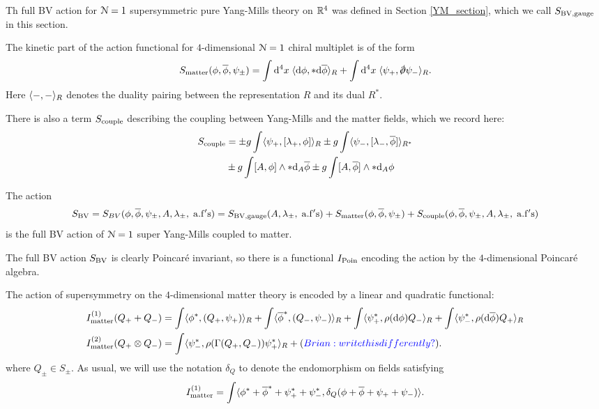 \documentclass[10pt, oneside]{article}
\begin{document}
Th full BV action for $\cN=1$ supersymmetric pure Yang-Mills theory on $\RR^4$ was defined in Section \ref{YM_section}, which we call $S_{\rm BV, gauge}$ in this section.

The kinetic part of the action functional for $4$-dimensional $\mc N = 1$ chiral multiplet is of the form
\[
S_{\rm matter} (\phi, \Bar{\phi}, \psi_{\pm}) = \int \d^4 x \; \<\d \phi , * \d \Bar{\phi}\>_R + \int \d^4 x \; \<\psi_+ , \sd \dd \psi_-\>_R .
\]
Here $\<-,-\>_R$ denotes the duality pairing between the representation $R$ and its dual $R^*$. 

There is also a term $S_{\rm couple}$ describing the coupling between Yang-Mills and the matter fields, which we record here:
\begin{align*}
S_{\rm couple} & = \pm g \int \<\psi_+, [\lambda_+, \phi]\>_R \pm g \int \<\psi_-, [\lambda_-, \Bar{\phi}]\>_{R^*} \\
& \pm g \int [A, \phi] \wedge * \d_{A} \Bar{\phi} \pm g \int [A, \Bar{\phi}] \wedge * \d_A \phi
\end{align*}

The action
\[
S_{\rm BV} = S_{BV}(\phi, \Bar{\phi}, \psi_\pm , A, \lambda_\pm, \; {\rm a.f's}) = S_{\rm BV, gauge}(A, \lambda_\pm, \; {\rm a.f's}) + S_{\rm matter}(\phi, \Bar{\phi}, \psi_\pm) + S_{\rm couple} (\phi, \Bar{\phi}, \psi_\pm , A, \lambda_\pm, \; {\rm a.f's}) 
\]
is the full BV action of $\mc N = 1$ super Yang-Mills coupled to matter.

The full BV action $S_{\rm BV}$ is clearly Poincar\'{e} invariant, so there is a functional $I_{\rm Poin}$ encoding the action by the $4$-dimensional Poincar\'{e} algebra.

The action of supersymmetry on the $4$-dimensional matter theory is encoded by a linear and quadratic functional:
\begin{align*}
I^{(1)}_{\rm matter} (Q_+ + Q_-) & = \int \<\phi^*, (Q_+, \psi_+)\>_R + \int \<\Bar{\phi}^*, (Q_-, \psi_-)\>_R + \int \<\psi^*_+, \rho(\d \phi) Q_- \>_R + \int \<\psi_-^*, \rho(\d \Bar{\phi}) Q_+\>_R \\
I^{(2)}_{\rm matter} (Q_+ \otimes Q_-) & = \int \<\psi^*_- , \rho(\Gamma(Q_+, Q_-)) \psi_+^*\>_R + \brian{write this differently?}.
\end{align*}
where $Q_\pm \in S_{\pm}$. 
As usual, we will use the notation $\delta_Q$ to denote the endomorphism on fields satisfying
\[
I^{(1)}_{\rm matter} = \int \<\phi^* + \Bar{\phi}^* + \psi^*_+ + \psi_-^*, \delta_Q(\phi + \Bar{\phi} + \psi_+ + \psi_-) \> .
\]
\end{document}
